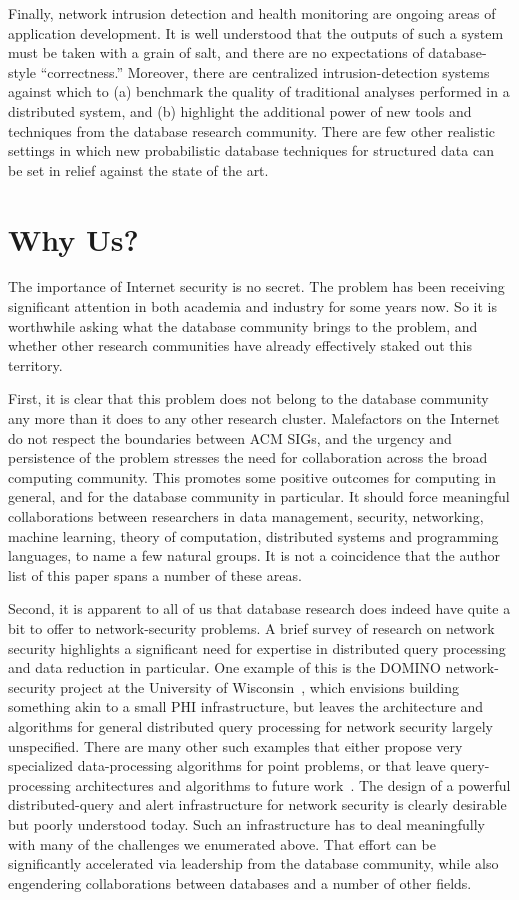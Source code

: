 \documentclass{acm_proc_article-sp}
\begin{document}
Finally, network intrusion detection and health monitoring are ongoing areas of application development. It is well understood that the outputs of such a system must be taken with a grain of salt, and there are no expectations of database-style ``correctness.'' Moreover, there are centralized intrusion-detection systems against which to (a) benchmark the quality of traditional analyses performed in a distributed system, and (b) highlight the additional power of new tools and techniques from the database research community. There are few other realistic settings in which new probabilistic database techniques for structured data can be set in relief against the state of the art.

\section{Why Us?} The importance of Internet security is no secret. The problem has been receiving significant attention in both academia and industry for some years now. So it is worthwhile asking what the database community brings to the problem, and whether other research communities have already effectively staked out this territory.

First, it is clear that this problem does not belong to the database community any more than it does to any other research cluster. Malefactors on the Internet do not respect the boundaries between ACM SIGs, and the urgency and persistence of the problem stresses the need for collaboration across the broad computing community. This promotes some positive outcomes for computing in general, and for the database community in particular. It should force meaningful collaborations between researchers in data management, security, networking, machine learning, theory of computation, distributed systems and programming languages, to name a few natural groups. It is not a coincidence that the author list of this paper spans a number of these areas.

Second, it is apparent to all of us that database research does indeed have quite a bit to offer to network-security problems. A brief survey of research on network security highlights a significant need for expertise in distributed query processing and data reduction in particular. One example of this is the DOMINO network-security project at the University of Wisconsin~\cite{domino}, which envisions building something akin to a small PHI infrastructure, but leaves the architecture and algorithms for general distributed query processing for network security largely unspecified. There are many other such examples that either propose very specialized data-processing algorithms for point problems, or that leave query-processing architectures and algorithms to future work~\cite{como,autograph,dragnet}. The design of a powerful distributed-query and alert infrastructure for network security is clearly desirable but poorly understood today. Such an infrastructure has to deal meaningfully with many of the challenges we enumerated above. That effort can be significantly accelerated via leadership from the database community, while also engendering collaborations between databases and a number of other fields.
\end{document}
